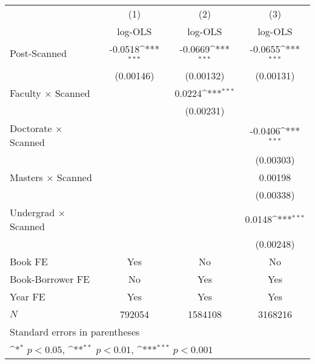 {
\def\sym#1{\ifmmode^{#1}\else\(^{#1}\)\fi}
\begin{tabular}{l*{3}{c}}
\hline\hline
            &\multicolumn{1}{c}{(1)}&\multicolumn{1}{c}{(2)}&\multicolumn{1}{c}{(3)}\\
            &\multicolumn{1}{c}{log-OLS}&\multicolumn{1}{c}{log-OLS}&\multicolumn{1}{c}{log-OLS}\\
\hline
Post-Scanned&     -0.0518\sym{***}&     -0.0669\sym{***}&     -0.0655\sym{***}\\
            &   (0.00146)         &   (0.00132)         &   (0.00131)         \\
[1em]
Faculty $\times$ Scanned&                     &      0.0224\sym{***}&                     \\
            &                     &   (0.00231)         &                     \\
[1em]
Doctorate $\times$ Scanned&                     &                     &     -0.0406\sym{***}\\
            &                     &                     &   (0.00303)         \\
[1em]
Masters $\times$  Scanned&                     &                     &     0.00198         \\
            &                     &                     &   (0.00338)         \\
[1em]
Undergrad $\times$ Scanned&                     &                     &      0.0148\sym{***}\\
            &                     &                     &   (0.00248)         \\
\hline
Book FE     &         Yes         &          No         &          No         \\
Book-Borrower FE&          No         &         Yes         &         Yes         \\
Year FE     &         Yes         &         Yes         &         Yes         \\
\(N\)       &      792054         &     1584108         &     3168216         \\
\hline\hline
\multicolumn{4}{l}{\footnotesize Standard errors in parentheses}\\
\multicolumn{4}{l}{\footnotesize \sym{*} \(p<0.05\), \sym{**} \(p<0.01\), \sym{***} \(p<0.001\)}\\
\end{tabular}
}
